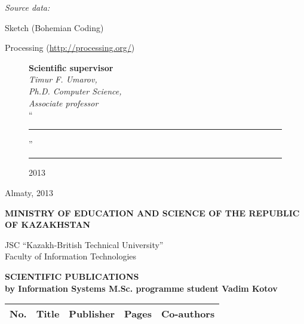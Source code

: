 \begin{titlepage}
    \emph{Source data:}
    
    \begin{compactitem}
    \item Sketch (Bohemian Coding)
    \item Processing (\url{http://processing.org/})
    \end{compactitem}


    \begin{figure}[ht]
            \begin{minipage}[t]{0.6\linewidth}
                {\bf Scientific supervisor}\\

                {\em Timur F. Umarov,\\
                Ph.D. Computer Science,\\
                Associate professor}\\
                
                ``\rule{2em}{0.4pt}'' \rule{8em}{0.4pt} 2013\\
         \end{minipage}
    \end{figure}
    
    \begin{center}
        \vfill
        Almaty, 2013
    \end{center}

    \pagebreak

    \begin{centering}
        {\bf{\MakeUppercase{Ministry of education and science of the republic of Kazakhstan}}

        \vspace{14pt}

        JSC ``Kazakh-British Technical University''\\
        Faculty of Information Technologies}

        \vspace{14pt}
        
        {\bf
        \MakeUppercase{Scientific publications}\\
        by Information Systems M.Sc. programme student Vadim Kotov
        }

        \vspace{14pt}
    \end{centering}

    \begin{centering}

        \begin{longtable}{|l|p{}|p{}|l|l|}
            \hline
            \textbf{No.} & \textbf{Title} & \textbf{Publisher} & \textbf{Pages} & \textbf{Co-authors}\\
            \endhead


\end{longtable}
\end{centering}
\end{titlepage}

